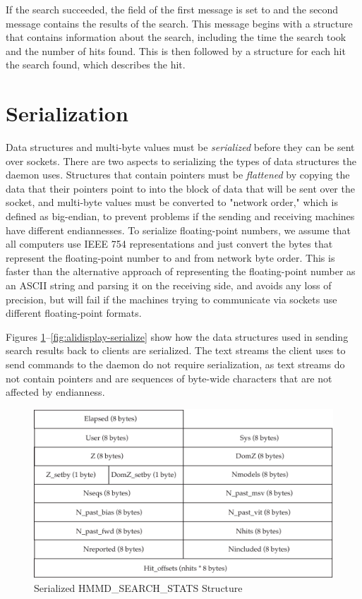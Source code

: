 \documentclass[notoc,justified]{tufte-book}    %
\begin{document}
If the search succeeded, the  field of the first message is set to  and the second message contains the results of the search.  This message begins with a  structure that contains information about the search, including the time the search took and the number of hits found.  This is then followed by a  structure for each hit the search found, which describes the hit.

\section{Serialization}
Data structures and multi-byte values must be {\em serialized} before they can be sent over sockets.  There are two aspects to serializing the types of data structures the daemon uses.  Structures that contain pointers must be {\em flattened} by copying the data that their pointers point to into the block of data that will be sent over the socket, and multi-byte values must be converted to "network order," which is defined as big-endian, to prevent problems if the sending and receiving machines have different endiannesses.  To serialize floating-point numbers, we assume that all computers use IEEE 754 representations and just convert the bytes that represent the floating-point number to and from network byte order.  This is faster than the alternative approach of representing the floating-point number as an ASCII string and parsing it on the receiving side, and avoids any loss of precision, but will fail if the machines trying to communicate via sockets use different floating-point formats.  

Figures \ref{fig:search-stats-serialize}--\ref{fig:alidisplay-serialize} show how the data structures used in sending search results back to clients are serialized.  The text streams the client uses to send commands to the daemon do not require serialization, as text streams do not contain pointers and are sequences of byte-wide characters that are not affected by endianness.    

\begin{figure}
\includegraphics[width=\textwidth]{inclusions/hmmpgmd-search-stats-serialize.pdf}
\caption{Serialized {HMMD\_SEARCH\_STATS} Structure}
\label{fig:search-stats-serialize}
\end{figure} 
\end{document}
